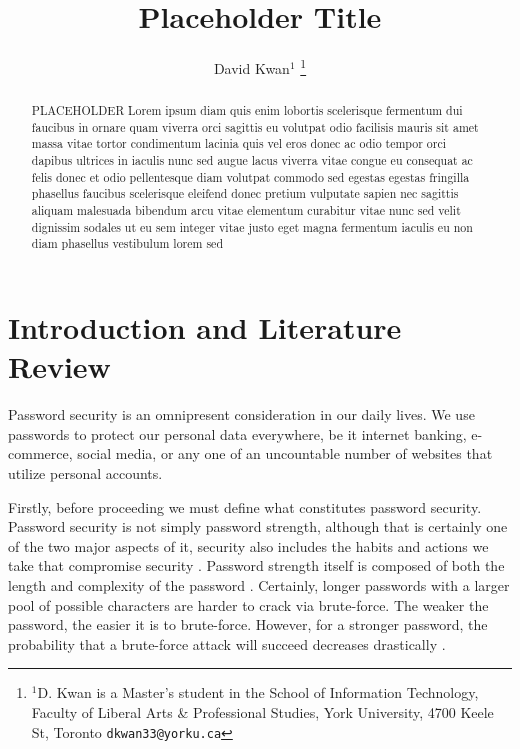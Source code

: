\documentclass[letterpaper, 10 pt, conference]{ieeeconf}  %
\title{\LARGE \bf
Placeholder Title
}
\author{David Kwan$^{1}$%
\thanks{$^{1}$D. Kwan is a Master's student in the School of Information Technology, Faculty of Liberal Arts \& Professional Studies, York University, 4700 Keele St, Toronto
        {\tt\small dkwan33@yorku.ca}}%
}
\begin{document}
\maketitle
\thispagestyle{empty}
\pagestyle{empty}


\begin{abstract}

PLACEHOLDER Lorem ipsum diam quis enim lobortis scelerisque fermentum dui faucibus in ornare quam viverra orci sagittis eu volutpat odio facilisis mauris sit amet massa vitae tortor condimentum lacinia quis vel eros donec ac odio tempor orci dapibus ultrices in iaculis nunc sed augue lacus viverra vitae congue eu consequat ac felis donec et odio pellentesque diam volutpat commodo sed egestas egestas fringilla phasellus faucibus scelerisque eleifend donec pretium vulputate sapien nec sagittis aliquam malesuada bibendum arcu vitae elementum curabitur vitae nunc sed velit dignissim sodales ut eu sem integer vitae justo eget magna fermentum iaculis eu non diam phasellus vestibulum lorem sed

\end{abstract}


\section{Introduction and Literature Review}

Password security is an omnipresent consideration in our daily lives. We use passwords to protect our personal data everywhere, be it internet banking, e-commerce, social media, or any one of an uncountable number of websites that utilize personal accounts. 

Firstly, before proceeding we must define what constitutes password security. Password security is not simply password strength, although that is certainly one of the two major aspects of it, security also includes the habits and actions we take that compromise security \cite{Dhamija2000}. Password strength itself is composed of both the length and complexity of the password \cite{Morris1979}. Certainly, longer passwords with a larger pool of possible characters are harder to crack via brute-force. The weaker the password, the easier it is to brute-force. However, for a stronger password, the probability that a brute-force attack will succeed decreases drastically \cite{DellAmico2010}.
\end{document}
